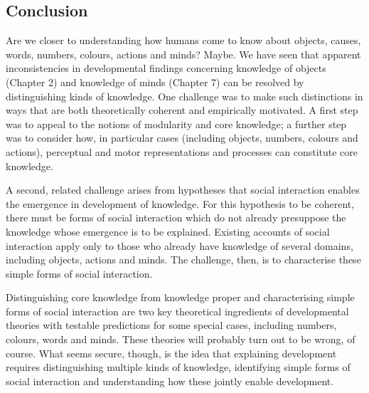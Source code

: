 \documentclass[12pt,\papersize]{extarticle}
\begin{document}

\subsection{Conclusion}
Are we closer to understanding 
how humans come to know about %
objects,
causes,
words,
numbers,
colours,
actions
and
minds? 
Maybe.
We have seen that apparent inconsistencies in developmental findings concerning knowledge of objects (Chapter 2) and knowledge of minds (Chapter 7) can be resolved by distinguishing kinds of knowledge.
One challenge was to make such distinctions in ways that are both  theoretically coherent and empirically motivated.
A first step was to appeal to the notions of modularity and core knowledge; a further step was to consider how, in particular cases (including objects, numbers, colours and actions), perceptual and motor representations and processes can constitute core knowledge.

A second, related challenge arises from hypotheses that social interaction enables the emergence in development of knowledge.  
For this hypothesis to be coherent, there must be forms of social interaction which do not already presuppose the knowledge whose emergence is to be explained.
Existing accounts of social interaction apply only to those who already have knowledge of several domains, including objects, actions and minds.
The challenge, then, is to characterise these simple forms of social interaction.

Distinguishing core knowledge from knowledge proper 
and
characterising simple forms of social interaction
are 
two key theoretical ingredients of
developmental theories with testable predictions for some special cases, including numbers, colours, words and minds.
These theories will probably turn out to be wrong, of course.
What seems secure, though, is the idea that explaining development requires 
distinguishing multiple kinds of knowledge, 
identifying simple forms of social interaction 
and 
understanding how 
	these jointly enable development.






\end{document}
